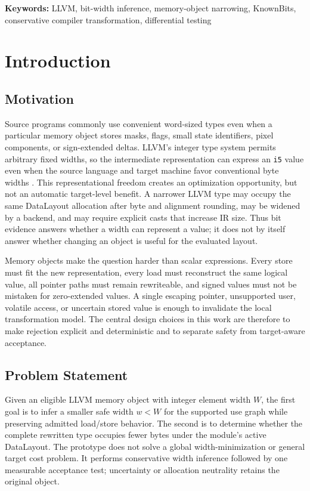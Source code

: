 \documentclass[11pt,twocolumn]{article}
\begin{document}
\noindent\textbf{Keywords:} LLVM, bit-width inference, memory-object narrowing,
KnownBits, conservative compiler transformation, differential testing

\section{Introduction}

\subsection{Motivation}

Source programs commonly use convenient word-sized types even when a particular
memory object stores masks, flags, small state identifiers, pixel components, or
sign-extended deltas. LLVM's integer type system permits arbitrary fixed widths,
so the intermediate representation can express an \texttt{i5} value even when
the source language and target machine favor conventional byte widths
\citep{llvmLangRef}. This representational freedom creates an optimization
opportunity, but not an automatic target-level benefit. A narrower LLVM type may
occupy the same DataLayout allocation after byte and alignment rounding, may be
widened by a backend, and may require explicit casts that increase IR size.
Thus bit evidence answers whether a width can represent a value; it does not by
itself answer whether changing an object is useful for the evaluated layout.

Memory objects make the question harder than scalar expressions. Every store
must fit the new representation, every load must reconstruct the same logical
value, all pointer paths must remain rewriteable, and signed values must not be
mistaken for zero-extended values. A single escaping pointer, unsupported user,
volatile access, or uncertain stored value is enough to invalidate the local
transformation model. The central design choices in this work are therefore to
make rejection explicit and deterministic and to separate safety from
target-aware acceptance.

\subsection{Problem Statement}

Given an eligible LLVM memory object with integer element width $W$, the first
goal is to infer a smaller safe width $w<W$ for the supported use graph while
preserving admitted load/store behavior. The second is to determine whether the
complete rewritten type occupies fewer bytes under the module's active
DataLayout. The prototype does not solve a global width-minimization or general
target cost problem. It performs conservative width inference followed by one
measurable acceptance test; uncertainty or allocation neutrality retains the
original object.
\end{document}
